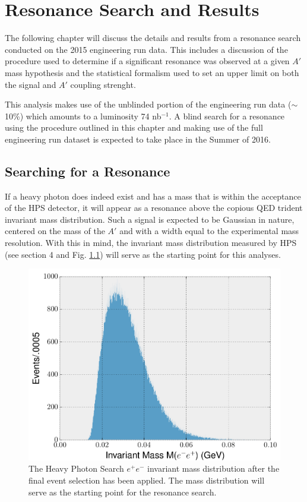 
\chapter{Resonance Search and Results}

The following chapter will discuss the details and results from a resonance 
search conducted on the 2015 engineering run data.  This includes a discussion
of the procedure used to determine if a significant resonance was observed at 
a given $A'$ mass hypothesis and the statistical formalism used to set an upper
limit on both the signal and $A'$ coupling strenght.

This analysis makes use of
the unblinded portion of the engineering run data ($\sim$ 10\%) which amounts to 
a luminosity 74 nb$^{-1}$.  A blind search for a resonance using the procedure 
outlined in this chapter and making use of the full engineering run 
dataset is expected to take place in the Summer of 2016.

\section{Searching for a Resonance}

If a heavy photon does indeed exist and has a mass that is within the acceptance
of the HPS detector, it will appear as a resonance above the copious QED trident
invariant mass distribution.  Such a signal is expected to be Gaussian in nature, 
centered on the mass of the $A'$ and with a width equal to the experimental
mass resolution. With this in mind, the invariant mass distribution measured by
HPS (see section 4 and Fig. \ref{fig:mass_distribution}) will serve as the 
starting point for this analyses.
\begin{figure}[t]
    \centering
    \includegraphics[width=1.0\textwidth]{images/invariant_mass_final.png}
    \caption{The Heavy Photon Search $e^+e^-$ invariant mass distribution after
             the final event selection has been applied.  The mass distribution
             will serve as the starting point for the resonance search.}
    \label{fig:mass_distribution}
\end{figure}

